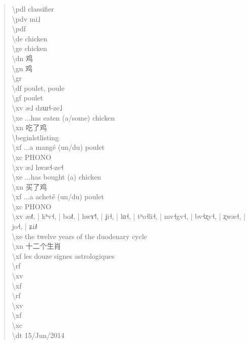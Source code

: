 \documentclass[a4paper,12pt]{article}
\newcommand{\ipa}[1]{{\phon #1}}
\newcommand{\zh}[1]{{\cn #1}}
\begin{document}
\begin{quote}
\textbackslash pdl classifier \\
\textbackslash pdv \ipa{mi˩} \\
\textbackslash pdf \\
\textbackslash de chicken \\
\textbackslash ge chicken \\
\textbackslash dn \zh{鸡} \\
\textbackslash gn \zh{鸡} \\
\textbackslash gr \\
\textbackslash df poulet, poule \\
\textbackslash gf poulet \\
\textbackslash xv \ipa{æ˩ dzɯ˧-ze˩} \\
\textbackslash xe ...has eaten (a/some) chicken \\
\textbackslash xn \zh{吃了鸡} \\
\textbackslash begin{lstlisting} \\
\textbackslash xf ...a mangé (un/du) poulet \\
\textbackslash xc PHONO \\
\textbackslash xv \ipa{æ˩ hwæ˧-ze˧} \\
\textbackslash xe ...has bought (a) chicken \\
\textbackslash xn \zh{买了鸡} \\
\textbackslash xf ...a acheté (un/du) poulet \\
\textbackslash xc PHONO \\
\textbackslash xv \ipa{æ˩˥, | kʰv˧, | bo˩˥, | hwɤ˧˥, | ʝi˧, | lɑ˧, | tʰo˧li˧, | mv˧gv˧, | bv˧ʐv˧, | ʐwæ˧, | jo˧, | ʑi˩˥} \\
\textbackslash xe the twelve years of the duodenary cycle \\
\textbackslash xn \zh{十二个生肖} \\
\textbackslash xf les douze signes astrologiques \\
\textbackslash rf \\
\textbackslash xv \\
\textbackslash xf \\
\textbackslash rf \\
\textbackslash xv \\
\textbackslash xf \\
\textbackslash xc \\
\textbackslash dt 15/Jun/2014
\end{quote}

\pagebreak


\end{document}
